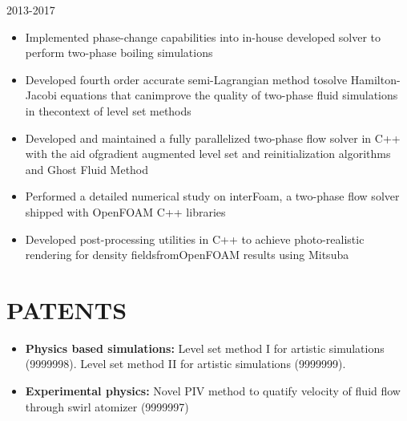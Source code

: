 \documentclass{res}
\begin{document}
\begin{resume}
	\hspace*{-0.25in}{\bf Research Assistant} \hfill 2013-2017 \\
	\hspace*{-0.25in}{\it Texas A\&M, Madison, WI}
	\begin{itemize}[leftmargin=\parindent]
	\setlength{\itemsep}{0mm} \smallskip
	
		\item Implemented phase-change capabilities into in-house developed solver to perform two-phase boiling simulations
		\item Developed fourth order accurate semi-Lagrangian method tosolve Hamilton-Jacobi equations that canimprove the quality of two-phase fluid simulations in thecontext of level set methods
		\item Developed and maintained a fully parallelized two-phase flow solver in C++ with the aid ofgradient augmented level set and reinitialization algorithms and Ghost Fluid Method
		\item Performed a detailed numerical study on interFoam, a two-phase flow solver shipped with OpenFOAM C++ libraries
		\item Developed post-processing utilities in C++ to achieve photo-realistic rendering for density fieldsfromOpenFOAM results using Mitsuba
	\end{itemize}
	
	
	
	
	\section{\MakeUppercase{Patents}} \vskip 0.35in
	\begin{itemize}[leftmargin=\parindent]
	\setlength{\itemsep}{6pt}
	
		\item[] {\bf Physics based simulations:} Level set method I for artistic simulations (9999998). Level set method II for artistic simulations (9999999).
		\item[] {\bf Experimental physics:} Novel PIV method to quatify velocity of fluid flow through swirl atomizer (9999997)
	\end{itemize}
	
		
	

\end{resume}
\end{document}
